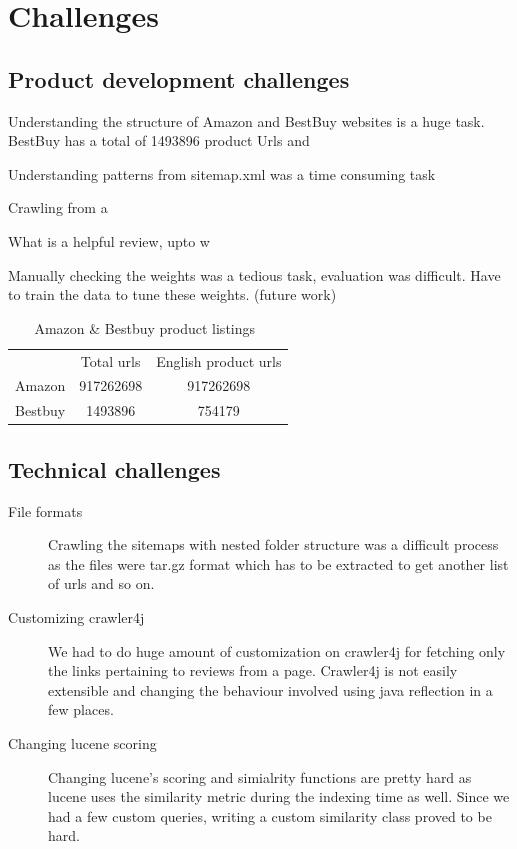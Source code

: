 \documentclass{article}
\begin{document}
\section{Challenges}
\subsection{Product development challenges}
\begin{description}
  \item Understanding the structure of Amazon and BestBuy websites is a huge task. BestBuy has a total of 1493896 product Urls and 
  \item Understanding patterns from sitemap.xml was a time consuming task
  \item Crawling from a 
  \item What is a helpful review, upto w
  \item Manually checking the weights was a tedious task, evaluation was difficult.  Have to train the data to tune these weights. (future work)
\end{description}

\begin{table}
  \centering
  \begin{tabular}{c c c} 
    & Total urls & English product urls \\
    Amazon & 917262698 & 917262698\\
    Bestbuy & 1493896 & 754179\\
  \end{tabular}
  \caption{Amazon \& Bestbuy product listings~\label{tab:bestbuy}}
\end{table}

\subsection{Technical challenges}
\begin{description}
  \item[File formats] Crawling the sitemaps with nested folder structure was a difficult process as the files were tar.gz format which has to be extracted to get another list of urls and so on.
  \item[Customizing crawler4j] We had to do huge amount of customization on crawler4j for fetching only the links pertaining to reviews from a page.  Crawler4j is not easily extensible and changing the behaviour involved using java reflection in a few places.
  \item[Changing lucene scoring]  Changing lucene's scoring and simialrity functions are pretty hard as lucene uses the similarity metric during the indexing time as well.  Since we had a few custom queries, writing a custom similarity class proved to be hard.
\end{description}
\end{document}
